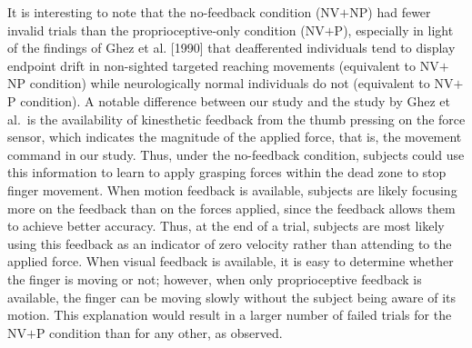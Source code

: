 \documentclass[prodmode,acmtap]{acmlarge}
\begin{document}
It is interesting to note that the no-feedback condition (NV$+$NP)
had fewer invalid trials than the proprioceptive-only condition
(NV$+$P), especially in light of the findings of Ghez et al. [1990]
that deafferented individuals tend to display endpoint drift in
non-sighted targeted reaching movements (equivalent to NV$+$NP
condition) while neurologically normal individuals do not (equivalent
to NV$+$P condition). A notable difference between our study and the
study by Ghez et al.\ is the availability of kinesthetic feedback
from the thumb pressing on the force sensor, which indicates the
magnitude of the applied force, that is, the movement command in our
study. Thus, under the no-feedback condition, subjects could use this
information to learn to apply grasping forces within the dead zone to
stop finger movement. When motion feedback is available, subjects are
likely focusing more on the feedback than on the forces applied,
since the feedback allows them to achieve better accuracy. Thus, at
the end of a trial, subjects are most likely using this feedback as
an indicator of zero velocity rather than attending to the applied
force. When visual feedback is available, it is easy to determine
whether the finger is moving or not; however, when only
proprioceptive feedback is available, the finger can be moving slowly
without the subject being aware of its motion. This explanation would
result in a larger number of failed trials for the NV$+$P condition
than for any other, as observed.
\end{document}
